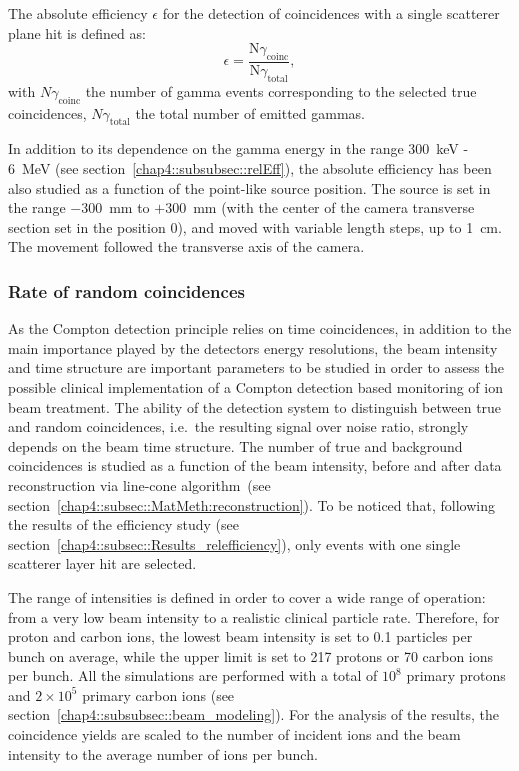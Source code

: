 The absolute efficiency $\epsilon$ for the detection of coincidences with a single scatterer plane hit is defined as:
\begin{equation}
\epsilon =\frac{\mathrm{N}\gamma_{\mathrm{coinc}}}{\mathrm{N}\gamma_{\mathrm{total}}},
\end{equation}
\label{chap4::eq::equation_absEff}
with $N\gamma_{\mathrm{coinc}}$ the number of gamma events corresponding to the selected true coincidences, $N\gamma_{\mathrm{total}}$ the total number of emitted gammas.

In addition to its dependence on the gamma energy in the range 300~keV - 6~MeV (see section~\ref{chap4::subsubsec::relEff}), the absolute efficiency has been also studied as a function of the point-like source position. The source is set in the range $-300$~mm to $+300$~mm (with the center of the camera transverse section set in the position 0), and moved with variable length steps, up to 1~cm. The movement followed the transverse axis of the camera. 

\subsubsection{Rate of random coincidences}\label{chap4::subsubsec::random}

As the Compton detection principle relies on time coincidences, in addition to the main importance played by the detectors energy resolutions, the beam intensity and time structure are important parameters to be studied in order to assess the possible clinical implementation of a Compton detection based monitoring of ion beam treatment. The ability of the detection system to distinguish between true and random coincidences, i.e.~the resulting signal over noise ratio, strongly depends on the beam time structure. The number of true and background coincidences is studied as a function of the beam intensity, before and after data reconstruction via line-cone algorithm~(see section~\ref{chap4::subsec::MatMeth:reconstruction}). To be noticed that, following the results of the efficiency study (see section~\ref{chap4::subsec::Results_relefficiency}), only events with one single scatterer layer hit are selected. 

The range of intensities is defined in order to cover a wide range of operation: from a very low beam intensity to a realistic clinical particle rate. Therefore, for proton and carbon ions, the lowest beam intensity is set to 0.1 particles per bunch on average, while the upper limit is set to 217 protons or 70 carbon ions per bunch. All the simulations are performed with a total of $10^{8}$ primary protons and  $2\times10^{5}$ primary carbon ions (see section~\ref{chap4::subsubsec::beam_modeling}). For the analysis of the results, the coincidence yields are scaled to the number of incident ions and the beam intensity to the average number of ions per bunch.

